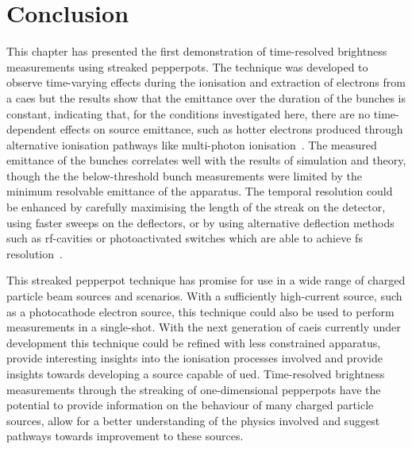 \section{Conclusion}
This chapter has presented the first demonstration of time-resolved brightness measurements using streaked pepperpots.
The technique was developed to observe time-varying effects during the ionisation and extraction of electrons from a \gls{caes} but the results show that the emittance over the duration of the bunches is constant, indicating that, for the conditions investigated here, there are no time-dependent effects on source emittance, such as hotter electrons produced through alternative ionisation pathways like multi-photon ionisation~\cite{speirs_identification_2017}.
The measured emittance of the bunches correlates well with the results of simulation and theory, though the the below-threshold bunch measurements were limited by the minimum resolvable emittance of the apparatus.
The temporal resolution could be enhanced by carefully maximising the length of the streak on the detector, using faster sweeps on the deflectors, or by using alternative deflection methods such as rf-cavities or photoactivated switches which are able to achieve \unit[100]{fs} resolution~\cite{li_note:_2010,kassier_compact_2010,van_rens_theory_2018}.

This streaked pepperpot technique has promise for use in a wide range of charged particle beam sources and scenarios.
With a sufficiently high-current source, such as a photocathode electron source, this technique could also be used to perform measurements in a single-shot.
With the next generation of \gls{caeis} currently under development this technique could be refined with less constrained apparatus, provide interesting insights into the ionisation processes involved and provide insights towards developing a source capable of \gls{ued}.
Time-resolved brightness measurements through the streaking of one-dimensional pepperpots have the potential to provide information on the behaviour of many charged particle sources, allow for a better understanding of the physics involved and suggest pathways towards improvement to these sources.
